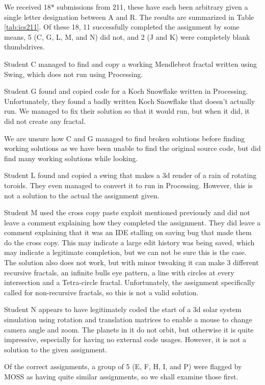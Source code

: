 \documentclass[letterpaper,10pt,conference]{IEEEtran}
\begin{document}
We received 18* submissions from 211, these have each been arbitrary given a single letter designation between A and R.  The results are summarized in Table \ref{tab:ics211}.  Of these 18, 11 successfully completed the assignment by some means, 5 (C, G, L, M, and N) did not, and 2 (J and K) were completely blank thumbdrives.

Student C managed to find and copy a working Mendlebrot fractal written using Swing, which does not run using Processing.

Student G found and copied code for a Koch Snowflake written in Processing.  Unfortunately, they found a badly written Koch Snowflake that doesn't actually run.  We managed to fix their solution so that it would run, but when it did, it did not create any fractal.

We are unsure how C and G managed to find broken solutions before finding working solutions as we have been unable to find the original source code, but did find many working solutions while looking.

Student L found and copied a swing that makes a 3d render of a rain of rotating toroids.  They even managed to convert it to run in Processing.  However, this is not a solution to the actual the assignment given.

Student M used the cross copy paste exploit mentioned previously and did not leave a comment explaining how they completed the assignment.  They did leave a comment explaining that it was an IDE stalling on saving bug that made them do the cross copy.  This may indicate a large edit history was being saved, which may indicate a legitimate completion, but we can not be sure this is the case.  The solution also does not work, but with minor tweaking it can make 3 different recursive fractals, an infinite bulls eye pattern, a line with circles at every intersection and a Tetra-circle fractal.   Unfortunately, the assignment specifically called for non-recursive fractals, so this is not a valid solution.

Student N appears to have legitimately coded the start of a 3d solar system simulation using rotation and translation matrices to enable a mouse to change camera angle and zoom.  The planets in it do not orbit, but otherwise it is quite impressive, especially for having no external code usages.  However, it is not a solution to the given assignment.

Of the correct assignments, a group of 5 (E, F, H, I, and P) were flagged by MOSS as having quite similar assignments, so we shall examine those first.
\end{document}
